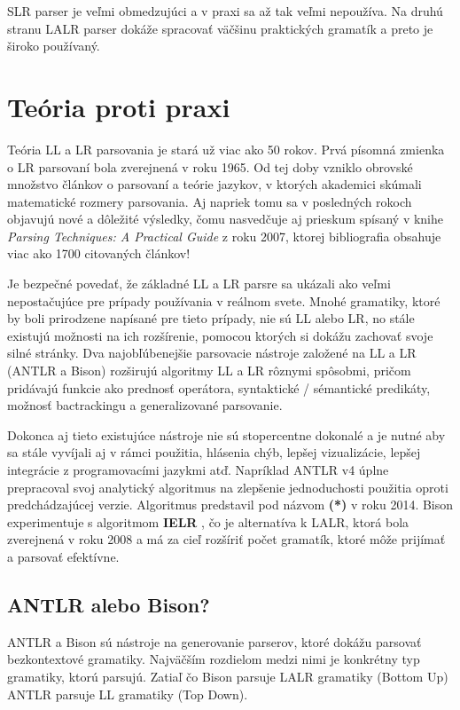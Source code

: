 SLR parser je veľmi obmedzujúci a v praxi sa až tak veľmi nepoužíva. Na druhú stranu LALR parser dokáže spracovať väčšinu praktických gramatík a preto je široko používaný.

\section{Teória proti praxi}
Teória LL a LR parsovania je stará už viac ako 50 rokov. Prvá písomná zmienka o LR parsovaní \cite{LR} bola zverejnená v roku 1965. Od tej doby vzniklo obrovské množstvo  článkov o parsovaní a teórie jazykov, v ktorých akademici skúmali matematické rozmery parsovania. Aj napriek tomu sa v posledných rokoch objavujú nové a dôležité výsledky, čomu nasvedčuje aj prieskum spísaný v knihe \textit{Parsing Techniques: A Practical Guide} \cite{grune2007parsing} z roku 2007, ktorej bibliografia obsahuje viac ako 1700 citovaných článkov! \cite{haberman:hard_parsing}

Je bezpečné povedať, že základné LL a LR parsre sa ukázali ako veľmi nepostačujúce pre prípady používania v reálnom svete. Mnohé gramatiky, ktoré by boli prirodzene napísané pre tieto prípady, nie sú LL alebo LR, no stále existujú možnosti na ich rozšírenie, pomocou ktorých si dokážu zachovať svoje silné stránky. Dva najobľúbenejšie parsovacie nástroje založené na LL a LR (ANTLR a Bison) rozširujú algoritmy LL a LR rôznymi spôsobmi, pričom pridávajú funkcie ako prednosť operátora, syntaktické / sémantické predikáty, možnosť bactrackingu a generalizované parsovanie.

Dokonca aj tieto existujúce nástroje nie sú stopercentne dokonalé a je nutné aby sa stále vyvíjali aj v rámci použitia, hlásenia chýb, lepšej vizualizácie, lepšej integrácie z programovacími jazykmi atď. Napríklad ANTLR v4 úplne prepracoval svoj analytický algoritmus na zlepšenie jednoduchosti použitia oproti predchádzajúcej verzie. Algoritmus predstavil pod názvom \textbf{(*)}\cite{ALL} v roku 2014. Bison experimentuje s algoritmom \textbf{IELR} \cite{IELR}, čo je alternatíva k LALR, ktorá bola zverejnená v roku 2008 a má za cieľ rozšíriť počet gramatík, ktoré môže prijímať a parsovať efektívne.

\subsection{ANTLR alebo Bison?}
ANTLR a Bison sú nástroje na generovanie parserov, ktoré dokážu parsovať bezkontextové gramatiky. Najväčším rozdielom medzi nimi je konkrétny typ gramatiky, ktorú parsujú. Zatiaľ čo Bison parsuje LALR gramatiky (Bottom Up) ANTLR parsuje LL gramatiky (Top Down). 


